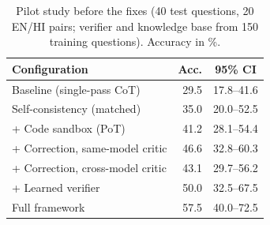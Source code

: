 \begin{table}[!t]
\centering
\footnotesize
\caption{Pilot study before the fixes (40 test questions, 20 EN/HI pairs; verifier and knowledge base from 150 training questions). Accuracy in \%.}
\label{tab:pilot}
\setlength{\tabcolsep}{3pt}
\begin{tabular}{lrc}
\toprule
Configuration & Acc. & 95\% CI \\
\midrule
Baseline (single-pass CoT) & 29.5 & 17.8--41.6 \\
Self-consistency (matched) & 35.0 & 20.0--52.5 \\
+ Code sandbox (PoT) & 41.2 & 28.1--54.4 \\
+ Correction, same-model critic & 46.6 & 32.8--60.3 \\
+ Correction, cross-model critic & 43.1 & 29.7--56.2 \\
+ Learned verifier & 50.0 & 32.5--67.5 \\
Full framework & 57.5 & 40.0--72.5 \\
\bottomrule
\end{tabular}
\end{table}
